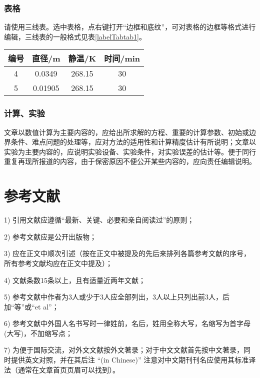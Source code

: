 \documentclass[10.5pt,twocolumn]{jbuaa}
\begin{document}
\subsubsection{表格}
请使用三线表。选中表格，点右键打开``边框和底纹”，可对表格的边框等格式进行编辑，三线表的一般格式见表\ref{labelTabtab1}。
\begin{table}[h]
 \centering
 \captionnamefont{\xiaowuhao\bf }
 \captiontitlefont{\xiaowuhao\bf }
 \renewcommand\tabcolsep{1em}
 \begin{tabular}{cccc}
  \toprule
  {编号} & {直径}/\si{\metre} & {静温}/\si{\kelvin} & {时间}/min \\
  \midrule
  4      & 0.0349             & 268.15              & 30         \\
  5      & 0.01905            & 268.15              & 30         \\
  \bottomrule
 \end{tabular}
\end{table}

\subsubsection{计算、实验}
文章以数值计算为主要内容的，应给出所求解的方程、重要的计算参数、初始或边界条件、难点问题的处理等，应对方法的适用性和计算精度估计有所说明；文章以实验为主要内容的，应说明实验设备、实验条件，对实验误差的估计等。便于同行重复再现所报道的内容，由于保密原因不便公开某些内容的，应向责任编辑说明。

\section{参考文献}
1) 引用文献应遵循``最新、关键、必要和亲自阅读过”的原则；

2) 参考文献应是公开出版物；

3) 应在正文中顺次引述（按在正文中被提及的先后来排列各篇参考文献的序号，所有参考文献均应在正文中提及）；

4) 文献条数15条以上，且有适量近两年文献；

5) 参考文献中作者为3人或少于3人应全部列出，3人以上只列出前3人，后加``等”或``et al”；

6) 参考文献中外国人名书写时一律姓前，名后，姓用全称大写，名缩写为首字母(大写)，不加缩写点；

7) 为便于国际交流，对外文文献按外文著录；对于中文文献首先按中文著录，同时提供英文对照，并在其后注 ``(in Chinese)” 注意对中文期刊刊名应使用其标准译法（通常在文章首页页眉可以找到）。
\end{document}
